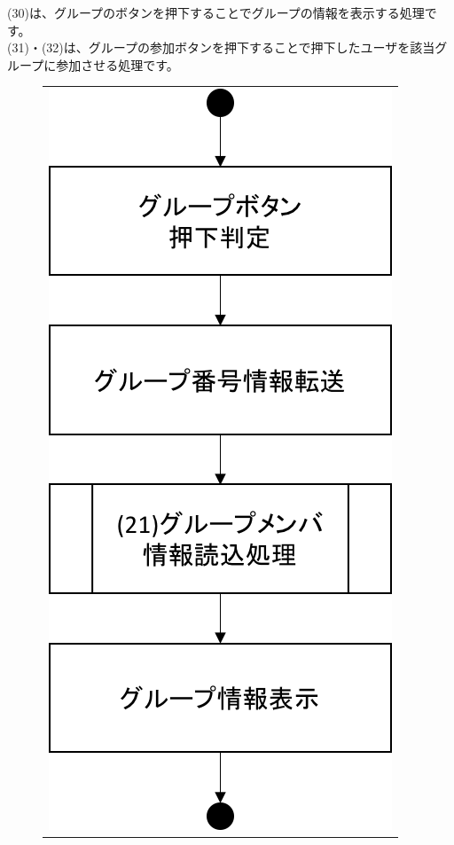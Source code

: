 (30)は、グループのボタンを押下することでグループの情報を表示する処理です。\\
(31)・(32)は、グループの参加ボタンを押下することで押下したユーザを該当グループに参加させる処理です。


\begin{figure}[htbp]
  \begin{tabular}{c}
 \begin{minipage}{0.33\hsize}
  \begin{center}
   \includegraphics[width=0.8\linewidth,clip]{./img/flow/30.png}

\end{center}
\end{minipage}
\end{tabular}
\end{figure}

